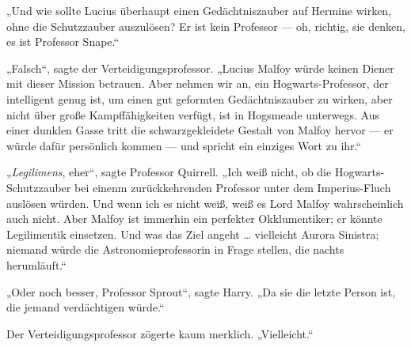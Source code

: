 „Und wie sollte Lucius überhaupt einen Gedächtniszauber auf Hermine wirken, ohne die Schutzzauber auszulösen? Er ist kein Professor — oh, richtig, sie denken, es ist Professor Snape.“

„Falsch“, sagte der Verteidigungsprofessor.
„Lucius Malfoy würde keinen Diener mit dieser Mission betrauen. Aber nehmen wir an, ein Hogwarts-Professor, der intelligent genug ist, um einen gut geformten Gedächtniszauber zu wirken, aber nicht über große Kampffähigkeiten verfügt, ist in Hogsmeade unterwegs. Aus einer dunklen Gasse tritt die schwarzgekleidete Gestalt von Malfoy hervor — er würde dafür persönlich kommen — und spricht ein einziges Wort zu ihr.“


„\emph{Legilimens}, eher“, sagte Professor Quirrell.
„Ich weiß nicht, ob die Hogwarts-Schutzzauber bei einenm zurückkehrenden Professor unter dem Imperius-Fluch auslösen würden. Und wenn ich es nicht weiß, weiß es Lord Malfoy wahrscheinlich auch nicht. Aber Malfoy ist immerhin ein perfekter Okklumentiker; er könnte Legilimentik einsetzen. Und was das Ziel angeht … vielleicht Aurora Sinistra; niemand würde die Astronomieprofessorin in Frage stellen, die nachts herumläuft.“

„Oder noch besser, Professor Sprout“, sagte Harry.
„Da sie die letzte Person ist, die jemand verdächtigen würde.“

Der Verteidigungsprofessor zögerte kaum merklich.
„Vielleicht.“

